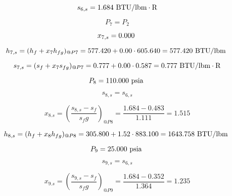 \documentclass{article}
\begin{document}
\begin{equation}
  s_{ 6,s} =    1.684\textnormal{ BTU/lbm}\cdot\textnormal{R}
\end{equation}

\begin{equation}
P_{ 7} = P_{ 2}
\end{equation}

\begin{equation}
  x_{ 7,s} =    0.000\textnormal{                           }
\end{equation}

\begin{equation}
  h_{ 7,s} = (h_{f} + x_{ 7}h_{fg})_{@P 7} =  577.420 + 0.00\cdot 605.640 =  577.420
\textnormal{ BTU/lbm                   }
\end{equation}

\begin{equation}
  s_{ 7,s} = (s_{f} + x_{ 7}s_{fg})_{@P 7} =    0.777 + 0.00\cdot   0.587 =    0.777
\textnormal{ BTU/lbm}\cdot\textnormal{R}
\end{equation}

\begin{equation}
P_{ 8} =  110.000\textnormal{ psia                      }
\end{equation}

\begin{equation}
s_{ 8,s} = s_{ 6,s}
\end{equation}

\begin{equation}
x_{ 8.s} = (\frac{s_{ 8,s} - s_{f}}{s_fg})_{@P 8} = \frac{   1.684 -    0.483}{   1.111} =    1.515
\end{equation}

\begin{equation}
  h_{ 8,s} = (h_{f} + x_{ 8}h_{fg})_{@P 8} =  305.800 + 1.52\cdot 883.100 = 1643.758
\textnormal{ BTU/lbm                   }
\end{equation}

\begin{equation}
P_{ 9} =   25.000\textnormal{ psia                      }
\end{equation}

\begin{equation}
s_{ 9,s} = s_{ 6,s}
\end{equation}

\begin{equation}
x_{ 9.s} = (\frac{s_{ 9,s} - s_{f}}{s_fg})_{@P 9} = \frac{   1.684 -    0.352}{   1.364} =    1.235
\end{equation}
\end{document}
